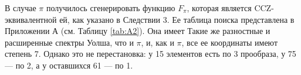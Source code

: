 В случае \(\pi\) получилось сгенерировать функцию \(F_\pi\), которая является CCZ-эквивалентной ей, как указано в Следствии 3. Ее таблица поиска представлена в Приложении А (см. Таблицу \ref{tab:A2}). Она имеет Такие же разностные и расширенные спектры Уолша, что и \(\pi\), и, как и \(\pi\), все ее координаты имеют степень 7. Однако это не перестановка: у 15 элементов есть по 3 прообраза, у 75 — по 2, а у оставшихся 61 — по 1.